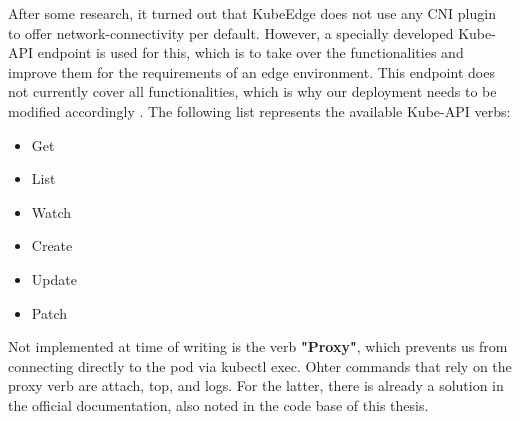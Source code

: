 \documentclass[MSC,Master,english]{twbook}%
\begin{document}
After some research, it turned out that KubeEdge does not use any CNI plugin to offer network-connectivity per default. However, a specially developed Kube-API endpoint is used for this, which is to take over the functionalities and improve them for the requirements of an edge environment. This endpoint does not currently cover all functionalities, which is why our deployment needs to be modified accordingly \cite{ke-ake-gh}.
\vspace{\baselineskip}
The following list represents the available Kube-API verbs:
\begin{itemize}
    \itemsep0em 
    \item Get
    \item List
    \item Watch
    \item Create
    \item Update
    \item Patch
\end{itemize}

Not implemented at time of writing is the verb \textbf{"Proxy"}, which prevents us from connecting directly to the pod via kubectl exec. Ohter commands that rely on the proxy verb are attach, top,  and logs. For the latter, there is already a solution in the official documentation, also noted in the code base of this thesis.\medbreak
\end{document}
